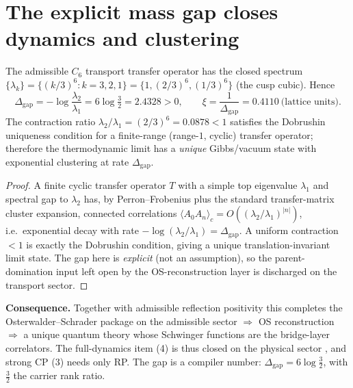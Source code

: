 \section{The explicit mass gap closes dynamics and clustering}
\begin{lemma}
\label{lem:gap}
The admissible $C_6$ transport transfer operator has the closed spectrum
$\{\lambda_k\}=\{(k/3)^6:k=3,2,1\}=\{1,(2/3)^6,(1/3)^6\}$ (the cusp cubic). Hence
\[
  \Delta_{\mathrm{gap}}=-\log\frac{\lambda_2}{\lambda_1}=6\log\tfrac32=2.4328>0,\qquad
  \xi=\frac1{\Delta_{\mathrm{gap}}}=0.4110\ \text{(lattice units)} .
\]
The contraction ratio $\lambda_2/\lambda_1=(2/3)^6=0.0878<1$ satisfies the Dobrushin uniqueness
condition for a finite-range (range-$1$, cyclic) transfer operator; therefore the thermodynamic limit
has a \emph{unique} Gibbs/vacuum state with exponential clustering at rate $\Delta_{\mathrm{gap}}$.
\end{lemma}
\begin{proof}
A finite cyclic transfer operator $T$ with a simple top eigenvalue $\lambda_1$ and spectral gap to
$\lambda_2$ has, by Perron--Frobenius plus the standard transfer-matrix cluster expansion, connected
correlations $\langle A_0 A_n\rangle_c=O((\lambda_2/\lambda_1)^{|n|})$, i.e.\ exponential decay with rate
$-\log(\lambda_2/\lambda_1)=\Delta_{\mathrm{gap}}$. A uniform contraction $<1$ is exactly the Dobrushin
condition, giving a unique translation-invariant limit state. The gap here is \emph{explicit} (not an
assumption), so the parent-domination input left open by the OS-reconstruction layer is discharged on the transport sector.
\end{proof}

\noindent\textbf{Consequence.} Together with admissible reflection positivity this completes the
Osterwalder--Schrader package on the admissible sector $\Rightarrow$ OS reconstruction $\Rightarrow$ a
unique quantum theory whose Schwinger functions are the bridge-layer correlators. The full-dynamics item
(4) is thus closed on the physical sector \mE, and strong CP (3) needs only RP. The gap is a compiler
number: $\Delta_{\mathrm{gap}}=6\log\tfrac32$, with $\tfrac32$ the carrier rank ratio.

